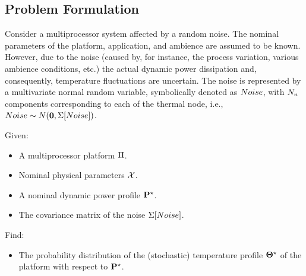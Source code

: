 \subsection{Problem Formulation}
Consider a multiprocessor system affected by a random noise. The nominal parameters of the platform, application, and ambience are assumed to be known. However, due to the noise (caused by, for instance, the process variation, various ambience conditions, etc.) the actual dynamic power dissipation and, consequently, temperature fluctuations are uncertain. The noise is represented by a multivariate normal random variable, symbolically denoted as $Noise$, with $N_n$ components corresponding to each of the thermal node, i.e., $Noise \sim N(\mathbf{0}, \Sigma[Noise])$.

Given:
\begin{itemize}
  \item A multiprocessor platform $\Pi$.
  \item Nominal physical parameters $\mathcal{X}$.
  \item A nominal dynamic power profile $\mathbf{P}^\star$.
  \item The covariance matrix of the noise $\Sigma[Noise]$.
\end{itemize}

Find:
\begin{itemize}
  \item The probability distribution of the (stochastic) temperature profile $\mathbf{\Theta}^\star$ of the platform with respect to $\mathbf{P}^\star$.
\end{itemize}

